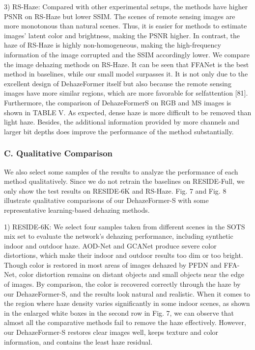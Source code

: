 3) RS-Haze: Compared with other experimental setups, the methods have higher PSNR on RS-Haze but lower SSIM. The scenes of remote sensing images are more monotonous than natural scenes. Thus, it is easier for methods to estimate images’ latent color and brightness, making the PSNR higher. In contrast, the haze of RS-Haze is highly non-homogeneous, making the high-frequency information of the image corrupted and the SSIM accordingly lower. We compare the image dehazing methods on RS-Haze. It can be seen that FFANet is the best method in baselines, while our small model surpasses it. It is not only due to the excellent design of DehazeFormer itself but also because the remote sensing images have more similar regions, which are more favorable for selfattention [81]. Furthermore, the comparison of DehazeFormerS on RGB and MS images is shown in TABLE V. As expected, dense haze is more difficult to be removed than light haze. Besides, the additional information provided by more channels and larger bit depths does improve the performance of the method substantially.

\subsubsection{C. Qualitative Comparison}

We also select some samples of the results to analyze the performance of each method qualitatively. Since we do not retrain the baselines on RESIDE-Full, we only show the test results on RESIDE-6K and RS-Haze. Fig. 7 and Fig. 8 illustrate qualitative comparisons of our DehazeFormer-S with some representative learning-based dehazing methods.

1) RESIDE-6K: We select four samples taken from different scenes in the SOTS mix set to evaluate the network’s dehazing performance, including synthetic indoor and outdoor haze. AOD-Net and GCANet produce severe color distortions, which make their indoor and outdoor results too dim or too bright. Though color is restored in most areas of images dehazed by PFDN and FFA-Net, color distortion remains on distant objects and small objects near the edge of images. By comparison, the color is recovered correctly through the haze by our DehazeFormer-S, and the results look natural and realistic. When it comes to the region where haze density varies significantly in some indoor scenes, as shown in the enlarged white boxes in the second row in Fig. 7, we can observe that almost all the comparative methods fail to remove the haze effectively. However, our DehazeFormer-S restores clear images well, keeps texture and color information, and contains the least haze residual.

